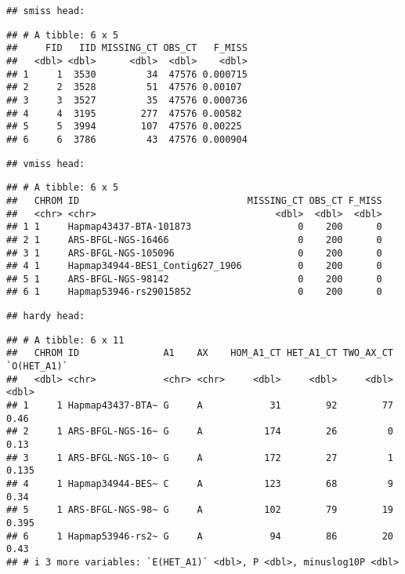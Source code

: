 \documentclass[
]{article}
\begin{document}
\begin{verbatim}
## smiss head:
\end{verbatim}

\begin{verbatim}
## # A tibble: 6 x 5
##     FID   IID MISSING_CT OBS_CT   F_MISS
##   <dbl> <dbl>      <dbl>  <dbl>    <dbl>
## 1     1  3530         34  47576 0.000715
## 2     2  3528         51  47576 0.00107 
## 3     3  3527         35  47576 0.000736
## 4     4  3195        277  47576 0.00582 
## 5     5  3994        107  47576 0.00225 
## 6     6  3786         43  47576 0.000904
\end{verbatim}

\begin{verbatim}
## vmiss head:
\end{verbatim}

\begin{verbatim}
## # A tibble: 6 x 5
##   CHROM ID                              MISSING_CT OBS_CT F_MISS
##   <chr> <chr>                                <dbl>  <dbl>  <dbl>
## 1 1     Hapmap43437-BTA-101873                   0    200      0
## 2 1     ARS-BFGL-NGS-16466                       0    200      0
## 3 1     ARS-BFGL-NGS-105096                      0    200      0
## 4 1     Hapmap34944-BES1_Contig627_1906          0    200      0
## 5 1     ARS-BFGL-NGS-98142                       0    200      0
## 6 1     Hapmap53946-rs29015852                   0    200      0
\end{verbatim}

\begin{verbatim}
## hardy head:
\end{verbatim}

\begin{verbatim}
## # A tibble: 6 x 11
##   CHROM ID               A1    AX    HOM_A1_CT HET_A1_CT TWO_AX_CT `O(HET_A1)`
##   <dbl> <chr>            <chr> <chr>     <dbl>     <dbl>     <dbl>       <dbl>
## 1     1 Hapmap43437-BTA~ G     A            31        92        77       0.46 
## 2     1 ARS-BFGL-NGS-16~ G     A           174        26         0       0.13 
## 3     1 ARS-BFGL-NGS-10~ G     A           172        27         1       0.135
## 4     1 Hapmap34944-BES~ C     A           123        68         9       0.34 
## 5     1 ARS-BFGL-NGS-98~ G     A           102        79        19       0.395
## 6     1 Hapmap53946-rs2~ G     A            94        86        20       0.43 
## # i 3 more variables: `E(HET_A1)` <dbl>, P <dbl>, minuslog10P <dbl>
\end{verbatim}
\end{document}
